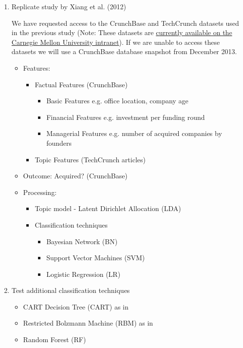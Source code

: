 \documentclass[../thesis/thesis.tex]{subfiles}
\begin{document}
\begin{enumerate}
\item Replicate study by Xiang et al. (2012) \cite{xiang2012}

We have requested access to the CrunchBase and TechCrunch datasets used in the previous study (Note: These datasets are \href{http://www.cs.cmu.edu/~guangx/crunchbase.html}{currently available on the Carnegie Mellon University intranet}). If we are unable to  access these datasets we will use a CrunchBase database snapshot from December 2013.

\begin{itemize}
\item   Features:
\begin{itemize}
\item   Factual Features (CrunchBase)
\begin{itemize}
\item   Basic Features e.g. office location, company age
\item   Financial Features e.g. investment per funding round
\item   Managerial Features e.g. number of acquired companies by founders
\end{itemize}
\item   Topic Features (TechCrunch articles)
\end{itemize}
\item   Outcome: Acquired? (CrunchBase)
\item   Processing:
\begin{itemize}
\item   Topic model - Latent Dirichlet Allocation (LDA)
\item   Classification techniques
\begin{itemize}
\item   Bayesian Network (BN)
\item   Support Vector Machines (SVM)
\item   Logistic Regression (LR)
\end{itemize}
\end{itemize}
\end{itemize}
\item Test additional classification techniques
\begin{itemize}
\item   CART Decision Tree (CART) as in \cite{beckwith2016}
\item   Restricted Bolzmann Machine (RBM) as in \cite{beckwith2016}
\item   Random Forest (RF)

\end{itemize}
\end{enumerate}
\end{document}
